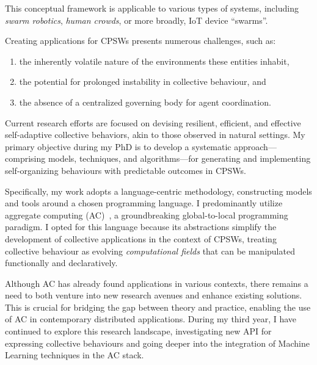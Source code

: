 \documentclass[11pt]{article}
\begin{document}
This conceptual framework is applicable to various types of systems, 
 including \textit{swarm robotics}, \textit{human crowds}, or more broadly, IoT device ``swarms''.

Creating applications for CPSWs presents numerous challenges, such as:
\begin{enumerate}
\item the inherently volatile nature of the environments these entities inhabit,
\item the potential for prolonged instability in collective behaviour, and
\item the absence of a centralized governing body for agent coordination.
\end{enumerate}

Current research efforts are focused on devising resilient, 
 efficient, and effective self-adaptive collective behaviors, 
 akin to those observed in natural settings. 
% 
My primary objective during my PhD is to develop a systematic approach—comprising models, 
 techniques, and algorithms—for generating and implementing self-organizing behaviours with predictable outcomes in CPSWs.

Specifically, my work adopts a language-centric methodology, constructing models and tools around a chosen programming language. I
 predominantly utilize aggregate computing (AC)~\cite{beal2015aggregate}, 
 a groundbreaking global-to-local programming paradigm. 
%
I opted for this language because its abstractions simplify the development of collective applications in the context of CPSWs, treating collective behaviour as evolving \textit{computational fields} that can be manipulated functionally and declaratively.

Although AC has already found applications in various contexts, 
 there remains a need to both venture into new research avenues and enhance existing solutions. 
 This is crucial for bridging the gap between theory and practice, enabling the use of AC in contemporary distributed applications. During my third year, I have continued to explore this research landscape, 
 investigating new API for expressing collective behaviours and going deeper into the integration of Machine Learning techniques in the AC stack.
\end{document}
